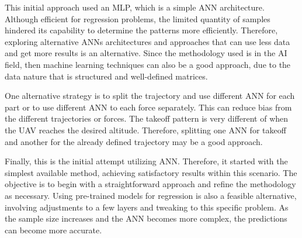 This initial approach used an MLP, which is a  simple ANN architecture.
Although efficient for regression problems, the limited quantity of samples hindered its capability to determine the patterns more efficiently.
Therefore, exploring alternative ANNs architectures and approaches that can use less data and get more results is an alternative.
Since the methodology used is in the AI field, then machine learning techniques can also be a good approach, due to the data nature that is structured and well-defined matrices.

One alternative strategy is to split the trajectory and use different ANN for each part or to use different ANN to each force separately. 
This can reduce bias from the different trajectories or forces.
The takeoff pattern is very different of when the UAV reaches the desired altitude.
Therefore, splitting one ANN for takeoff and another for the already defined trajectory may be a good approach.


Finally, this is the initial attempt utilizing ANN. 
Therefore, it started with the simplest available method, achieving satisfactory results within this scenario. The objective is to begin with a straightforward approach and refine the methodology as necessary. Using pre-trained models for regression is also a feasible alternative, involving adjustments to a few layers and tweaking to this specific problem. As the sample size increases and the ANN becomes more complex, the predictions can become more accurate.







